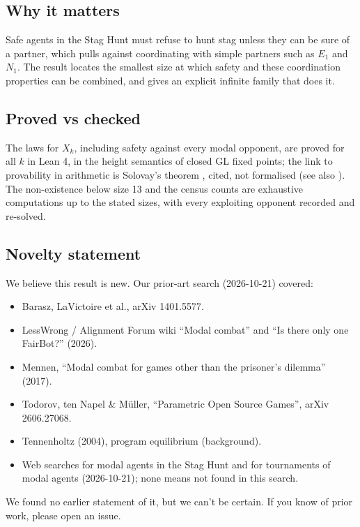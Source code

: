 \documentclass{article}
\begin{document}
\subsection*{Why it matters}

Safe agents in the Stag Hunt must refuse to hunt stag unless they can be sure of a partner, which
pulls against coordinating with simple partners such as $E_1$ and $N_1$. The result locates the
smallest size at which safety and these coordination properties can be combined, and gives an
explicit infinite family that does it.

\subsection*{Proved vs checked}

The laws for $X_k$, including safety against every modal opponent, are proved for all $k$ in
Lean 4, in the height semantics of closed GL fixed points; the link to provability in arithmetic
is Solovay's theorem \cite{solovay1976provability}, cited, not formalised (see also
\cite{boolos1993logic}). The non-existence below size 13 and the census counts are exhaustive
computations up to the stated sizes, with every exploiting opponent recorded and re-solved.

\subsection*{Novelty statement}

We believe this result is new. Our prior-art search (2026-10-21) covered:

\begin{itemize}
\item Barasz, LaVictoire et al., arXiv 1401.5577.
\item LessWrong / Alignment Forum wiki ``Modal combat'' and ``Is there only one FairBot?'' (2026).
\item Mennen, ``Modal combat for games other than the prisoner's dilemma'' (2017).
\item Todorov, ten Napel \& Müller, ``Parametric Open Source Games'', arXiv 2606.27068.
\item Tennenholtz (2004), program equilibrium (background).
\item Web searches for modal agents in the Stag Hunt and for tournaments of modal agents (2026-10-21); none means not found in this search.
\end{itemize}

We found no earlier statement of it, but we can't be certain. If you know of prior work, please open an issue.
\end{document}
